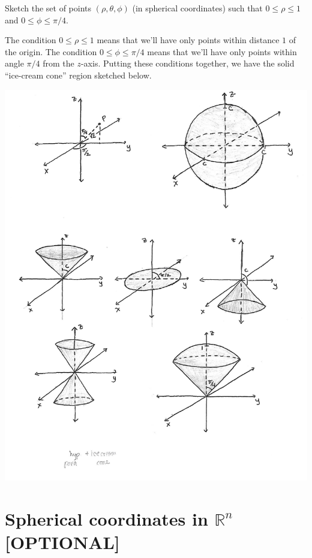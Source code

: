 \documentclass{ximera}
\begin{document}
\begin{example}
Sketch the set of points $(\rho,\theta,\phi)$ (in spherical coordinates) such that $0\leq \rho\leq 1$ and $0\leq\phi\leq\pi/4$.

The condition $0\leq \rho\leq 1$ means that we'll have only points within distance $1$ of the origin. The condition $0\leq\phi\leq\pi/4$ means that we'll have only points within angle $\pi/4$ from the $z$-axis. Putting these conditions together, we have the solid ``ice-cream cone'' region sketched below.

\begin{image}
\includegraphics{ice_cream}
\end{image}
\end{example}

\section{Spherical coordinates in $\mathbb{R}^n$ [OPTIONAL]}
\end{document}
